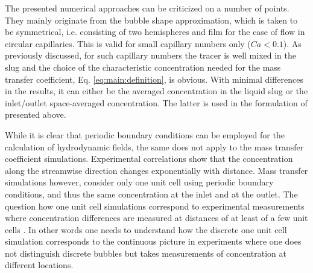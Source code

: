 \documentclass{article}
\begin{document}
The presented numerical approaches \cite{vanbaten-circular,kreutzer-overview}
can be criticized on a number of points. They mainly
originate from the bubble shape approximation, which is taken to be symmetrical, i.e.
consisting of two hemispheres and film for the case of flow in circular
capillaries. This is valid  for small capillary numbers only ($Ca<0.1$). As previously
discussed, for such capillary numbers the tracer is well mixed in the slug and 
the choice of the characteristic concentration needed for the mass transfer
coefficient, Eq. \ref{eq:main:definition}, is obvious. With minimal
differences in the results, it can either be the averaged concentration in the liquid slug
or the inlet/outlet space-averaged concentration. The latter is used in the formulation
of \citet{vanbaten-circular} presented above. 

While it is clear that periodic boundary conditions can be employed for the calculation
 of hydrodynamic fields, the same does not apply to the mass transfer coefficient
simulations. Experimental correlations \cite{bercic-mass} show that the
concentration along the streamwise direction changes exponentially with distance.
Mass transfer simulations however, consider only one unit cell
using periodic boundary conditions, and thus the same concentration at the inlet
and at the outlet. The question how one unit cell simulations correspond to
experimental measurements where concentration differences are measured at
 distances of at least of a few unit cells \cite{bercic-mass}. In
other words one needs to understand how the discrete one unit cell simulation
corresponds to the continuous picture in experiments where one does not
distinguish discrete bubbles but takes measurements of concentration at different
locations.
\end{document}
